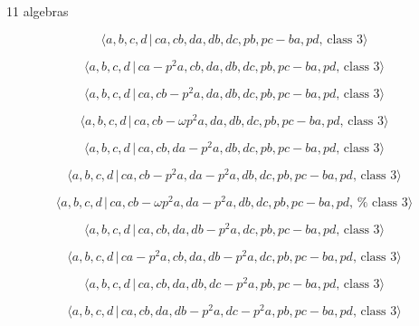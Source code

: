 \documentclass[10pt]{article}
\begin{document}
11 algebras

\begin{equation}
\langle a,b,c,d\,|\,ca,cb,da,db,dc,pb,pc-ba,pd,\,\text{class }3\rangle 
\tag{7.3656}
\end{equation}

\begin{equation}
\langle a,b,c,d\,|\,ca-p^2a,cb,da,db,dc,pb,pc-ba,pd,\,\text{class }3\rangle 
\tag{7.3657}
\end{equation}

\begin{equation}
\langle a,b,c,d\,|\,ca,cb-p^2a,da,db,dc,pb,pc-ba,pd,\,\text{class }3\rangle 
\tag{7.3658}
\end{equation}

\begin{equation}
\langle a,b,c,d\,|\,ca,cb-\omega p^{2}a,da,db,dc,pb,pc-ba,pd,\,\text{class }%
3\rangle  \tag{7.3659}
\end{equation}

\begin{equation}
\langle a,b,c,d\,|\,ca,cb,da-p^2a,db,dc,pb,pc-ba,pd,\,\text{class }3\rangle 
\tag{7.3660}
\end{equation}

\begin{equation}
\langle a,b,c,d\,|\,ca,cb-p^2a,da-p^2a,db,dc,pb,pc-ba,pd,\,\text{class }%
3\rangle  \tag{7.3661}
\end{equation}

\begin{equation}
\langle a,b,c,d\,|\,ca,cb-\omega p^{2}a,da-p^{2}a,db,dc,pb,pc-ba,pd,\,\text{%
class }3\rangle  \tag{7.3662}
\end{equation}

\begin{equation}
\langle a,b,c,d\,|\,ca,cb,da,db-p^2a,dc,pb,pc-ba,pd,\,\text{class }3\rangle 
\tag{7.3663}
\end{equation}

\begin{equation}
\langle a,b,c,d\,|\,ca-p^2a,cb,da,db-p^2a,dc,pb,pc-ba,pd,\,\text{class }%
3\rangle  \tag{7.3664}
\end{equation}

\begin{equation}
\langle a,b,c,d\,|\,ca,cb,da,db,dc-p^2a,pb,pc-ba,pd,\,\text{class }3\rangle 
\tag{7.3665}
\end{equation}

\begin{equation}
\langle a,b,c,d\,|\,ca,cb,da,db-p^2a,dc-p^2a,pb,pc-ba,pd,\,\text{class }%
3\rangle  \tag{7.3666}
\end{equation}
\end{document}

